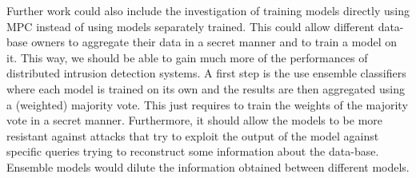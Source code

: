 Further work could also include the investigation of training models directly using MPC instead of using models separately trained. This could allow different data-base owners to aggregate their data in a secret manner and to train a model on it. This way, we should be able to gain much more of the performances of distributed intrusion detection systems. A first step is the use ensemble classifiers where each model is trained on its own and the results are then aggregated using a (weighted) majority vote. This just requires to train the weights of the majority vote in a secret manner. Furthermore, it should allow the models to be more resistant against attacks that try to exploit the output of the model against specific queries trying to reconstruct some information about the data-base. Ensemble models would dilute the information obtained between different models.

